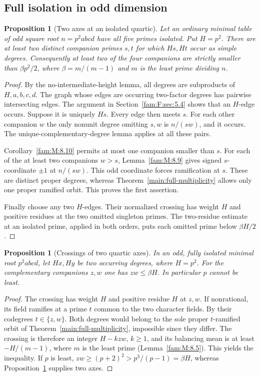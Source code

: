 \documentclass[11pt,a4paper]{article}
\numberwithin{equation}{section}
\newtheorem{proposition}[theorem]{Proposition}
\theoremstyle{remark}
\begin{document}
\subsection{Full isolation in odd dimension}\label{fam:C:sec:3}

\begin{proposition}[Two axes at an isolated quartic]\label{fam:C:3.1}
Let an ordinary minimal table of odd square root $n=p^2abcd$ have
all five primes isolated. Put $H=p^2$. There are at least two
distinct companion primes $s,t$ for which $Hs,Ht$ occur as simple
degrees. Consequently at least two of the four companions are
strictly smaller than $\beta p^2/2$, where $\beta=m/(m-1)$ and $m$
is the least prime dividing $n$.
\end{proposition}
\begin{proof}
By the no-intermediate-height lemma, all degrees are subproducts
of $H,a,b,c,d$. The graph whose edges are occurring two-factor
degrees has pairwise intersecting edges. The argument in Section~\ref{fam:F:sec:5.4}
shows that an $H$-edge occurs. Suppose it is uniquely $Hs$.
Every edge then meets $s$. For each other companion $w$ the only
nonunit degree omitting $s,w$ is $n/(sw)$, and it occurs. The
unique-complementary-degree lemma applies at all these pairs.

Corollary~\ref{fam:M:8.10} permits at most one companion smaller
than $s$. For each of the at least two companions $w>s$,
Lemma~\ref{fam:M:8.9} gives signed $s$-coordinate $\pm1$ at
$n/(sw)$. This odd coordinate forces ramification at $s$.
These are distinct proper degrees, whereas Theorem~\ref{main:full-multiplicity} allows only one proper ramified orbit. This proves the first assertion.

Finally choose any two $H$-edges. Their normalized crossing has
weight $H$ and positive residues at the two omitted singleton
primes. The two-residue estimate at an isolated prime, applied in
both orders, puts each omitted prime below $\beta H/2$.
\end{proof}

\begin{proposition}[Crossings of two quartic axes]\label{fam:C:3.2}\label{fam:C:n:matching}
In an odd, fully isolated minimal root $p^2abcd$, let $Hx,Hy$ be
two occurring degrees, where $H=p^2$. For the complementary companions
$z,w$ one has $zw\le\beta H$. In particular $p$ cannot be least.
\end{proposition}
\begin{proof}
The crossing has weight $H$ and positive residue $H$ at $z,w$.
If nonrational, its field ramifies at a prime $t$ common to the two
character fields. By their codegrees $t\in\{z,w\}$. Both degrees would belong to the sole proper
$t$-ramified orbit of Theorem~\ref{main:full-multiplicity},
impossible since they differ. The crossing is therefore an integer
$H-kzw$, $k\ge1$, and its balancing mean is at least
$-H/(m-1)$, where $m$ is the least prime
(Lemma~\ref{fam:M:8.5}). This yields the inequality.
If $p$ is least, $zw\ge(p+2)^2>p^3/(p-1)=\beta H$, whereas
Proposition~\ref{fam:C:3.1} supplies two axes.
\end{proof}
\end{document}
